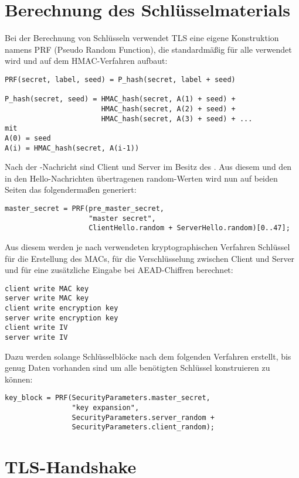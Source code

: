 \section{Berechnung des Schlüsselmaterials}
\label{sec_key_material}

Bei der Berechnung von Schlüsseln verwendet TLS eine eigene Konstruktion namens PRF (Pseudo Random Function), die standardmäßig für alle \ciphersuites{} verwendet wird und auf dem HMAC-Verfahren aufbaut:

\begin{lstlisting}
PRF(secret, label, seed) = P_hash(secret, label + seed)

P_hash(secret, seed) = HMAC_hash(secret, A(1) + seed) +
					   HMAC_hash(secret, A(2) + seed) +
					   HMAC_hash(secret, A(3) + seed) + ...
mit
A(0) = seed
A(i) = HMAC_hash(secret, A(i-1))
\end{lstlisting}

Nach der \clientkeyexchange{}-Nachricht sind Client und Server im Besitz des \premastersecret{}. Aus diesem und den in den Hello-Nachrichten übertragenen random-Werten wird nun auf beiden Seiten das \mastersecret{} folgendermaßen generiert:

\begin{lstlisting}
master_secret = PRF(pre_master_secret, 
					"master secret",
					ClientHello.random + ServerHello.random)[0..47];
\end{lstlisting}

Aus diesem \mastersecret{} werden je nach verwendeten kryptographischen Verfahren Schlüssel für die Erstellung des MACs, für die Verschlüsselung zwischen Client und Server und für eine zusätzliche Eingabe bei AEAD-Chiffren berechnet:
\begin{lstlisting}
client write MAC key
server write MAC key
client write encryption key
server write encryption key
client write IV
server write IV
\end{lstlisting}

Dazu werden solange Schlüsselblöcke nach dem folgenden Verfahren erstellt, bis genug Daten vorhanden sind um alle benötigten Schlüssel konstruieren zu können: 

\begin{lstlisting}
key_block = PRF(SecurityParameters.master_secret,
                "key expansion",
                SecurityParameters.server_random +
                SecurityParameters.client_random);
\end{lstlisting}


\section{TLS-Handshake}

